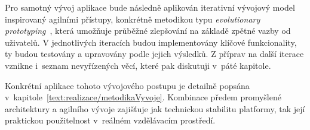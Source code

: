 Pro samotný vývoj aplikace bude následně aplikován iterativní vývojový model inspirovaný agilními přístupy, konkrétně metodikou typu \textit{evolutionary prototyping}~\cite{somerville2015software}, která umožňuje průběžné zlepšování na základě zpětné vazby od uživatelů. 
V jednotlivých iteracích budou implementovány klíčové funkcionality, ty budou testovány a upravovány podle jejich výsledků.
Z příprav na další iterace vznikne i~seznam nevyřízených věcí, které pak diskutuji v~páté kapitole.

Konkrétní aplikace tohoto vývojového postupu je detailně popsána v~kapitole~\ref{text:realizace/metodikaVyvoje}.
Kombinace předem promyšlené architektury a agilního vývoje zajišťuje jak technickou stabilitu platformy, tak její praktickou použitelnost v~reálném vzdělávacím prostředí.








